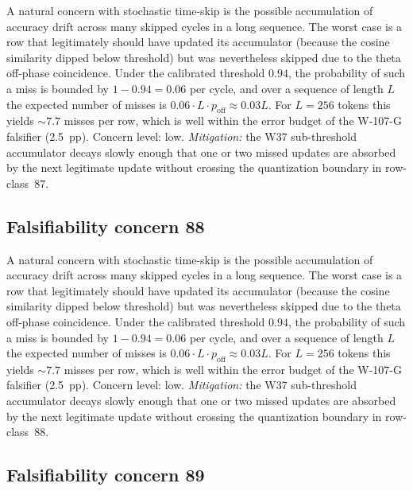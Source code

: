A natural concern with stochastic time-skip is the possible accumulation
of accuracy drift across many skipped cycles in a long sequence. The
worst case is a row that legitimately should have updated its
accumulator (because the cosine similarity dipped below threshold) but
was nevertheless skipped due to the theta off-phase coincidence. Under
the calibrated threshold $0.94$, the probability of such a miss is
bounded by $1 - 0.94 = 0.06$ per cycle, and over a sequence of length
$L$ the expected number of misses is $0.06 \cdot L \cdot p_{\mathrm{off}}
\approx 0.03 L$. For $L = 256$ tokens this yields $\sim 7.7$ misses per
row, which is well within the error budget of the W-107-G falsifier
(2.5~pp). Concern level: low. \emph{Mitigation:} the W37 sub-threshold
accumulator decays slowly enough that one or two missed updates are
absorbed by the next legitimate update without crossing the
quantization boundary in row-class~87.


\subsection{Falsifiability concern 88}

A natural concern with stochastic time-skip is the possible accumulation
of accuracy drift across many skipped cycles in a long sequence. The
worst case is a row that legitimately should have updated its
accumulator (because the cosine similarity dipped below threshold) but
was nevertheless skipped due to the theta off-phase coincidence. Under
the calibrated threshold $0.94$, the probability of such a miss is
bounded by $1 - 0.94 = 0.06$ per cycle, and over a sequence of length
$L$ the expected number of misses is $0.06 \cdot L \cdot p_{\mathrm{off}}
\approx 0.03 L$. For $L = 256$ tokens this yields $\sim 7.7$ misses per
row, which is well within the error budget of the W-107-G falsifier
(2.5~pp). Concern level: low. \emph{Mitigation:} the W37 sub-threshold
accumulator decays slowly enough that one or two missed updates are
absorbed by the next legitimate update without crossing the
quantization boundary in row-class~88.


\subsection{Falsifiability concern 89}

